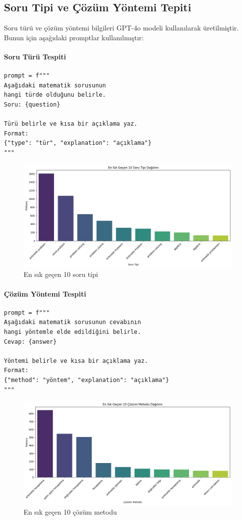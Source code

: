\documentclass[conference]{IEEEtran}
\begin{document}
\subsection{Soru Tipi ve Çözüm Yöntemi Tepiti}
Soru türü ve çözüm yöntemi bilgileri GPT-4o modeli kullanılarak üretilmiştir. Bunun için aşağıdaki promptlar kullanılmıştır:
\paragraph{Soru Türü Tespiti}
\begin{verbatim}
prompt = f"""
Aşağıdaki matematik sorusunun 
hangi türde olduğunu belirle.
Soru: {question}

Türü belirle ve kısa bir açıklama yaz.
Format: 
{"type": "tür", "explanation": "açıklama"}
"""
\end{verbatim}

\begin{figure}[htbp]
\centering
\includegraphics[width=1\linewidth]{soru-tipi.png}
\caption{En sık geçen 10 soru tipi}
\label{fig}
\end{figure}

\paragraph{Çözüm Yöntemi Tespiti}
\begin{verbatim}
prompt = f"""
Aşağıdaki matematik sorusunun cevabının 
hangi yöntemle elde edildiğini belirle.
Cevap: {answer}

Yöntemi belirle ve kısa bir açıklama yaz.
Format: 
{"method": "yöntem", "explanation": "açıklama"}
"""
\end{verbatim}

\begin{figure}[htbp]
\centering
\includegraphics[width=1\linewidth]{cozum-metodu.png}
\caption{En sık geçen 10 çözüm metodu}
\label{fig}
\end{figure}
\end{document}

